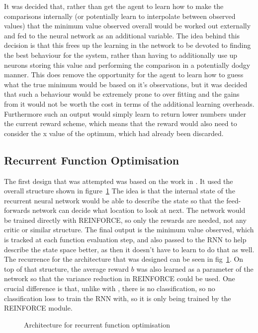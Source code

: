 It was decided that, rather than get the agent to learn how to make the comparisons internally (or potentially learn to interpolate between observed values) that the minimum value observed overall would be worked out externally and fed to the neural network as an additional variable. The idea behind this decision is that this frees up the learning in the network to be devoted to finding the best behaviour for the system, rather than having to additionally use up neurons storing this value and performing the comparison in a potentially dodgy manner. This does remove the opportunity for the agent to learn how to guess what the true minimum would be based on it's observations, but it was decided that such a behaviour would be extremely prone to over fitting and the gains from it would not be worth the cost in terms of the additional learning overheads. Furthermore such an output would simply learn to return lower numbers under the current reward scheme, which means that the reward would also need to consider the x value of the optimum, which had already been discarded.

\subsection{Recurrent Function Optimisation}
The first design that was attempted was based on the work in \cite{RVA}. It used the overall structure shown in figure~\ref{fig:RFOarch} The idea is that the internal state of the recurrent neural network would be able to describe the state so that the feed-forwards network can decide what location to look at next. The network would be trained directly with REINFORCE, so only the rewards are needed, not any critic or similar structure. The final output is the minimum value observed, which is tracked at each function evaluation step, and also passed to the RNN to help describe the state space better, as then it doesn't have to learn to do that as well. The recurrence for the architecture that was designed can be seen in fig~\ref{fig:RFOarch}. On top of that structure, the average reward $b$ was also learned as a parameter of the network so that the variance reduction in REINFORCE could be used. One crucial difference is that, unlike with \cite{RVA}, there is no classification, so no classification loss to train the RNN with, so it is only being trained by the REINFORCE module.

\begin{figure}
\centering

\caption{Architecture for recurrent function optimisation}
\label{fig:RFOarch}
\end{figure}

